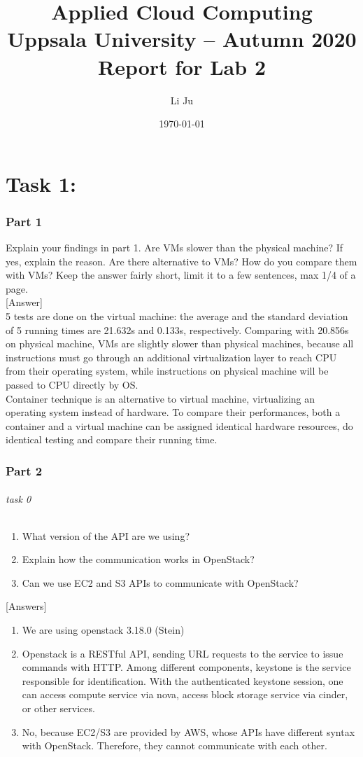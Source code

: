 \documentclass[a4paper,11pt]{article}
\title{\textbf{Applied Cloud Computing\\
    Uppsala University -- Autumn 2020 \\
    Report for Lab 2}}
\author{Li Ju}
\date{\today}
\begin{document}
\maketitle

\part{Task 1: }
\section{Part 1}
Explain your findings in part 1. Are VMs slower than the physical machine? If yes, explain the reason. Are there alternative to VMs? How do you compare them with VMs? Keep the answer fairly short, limit it to a few sentences, max 1/4 of a page.\\

[Answer]\\
5 tests are done on the virtual machine: the average and the standard deviation of 5 running times are 21.632s and 0.133s, respectively. Comparing with 20.856s on physical machine, VMs are slightly slower than physical machines, because all instructions must go through an additional virtualization layer to reach CPU from their operating system, while instructions on physical machine will be passed to CPU directly by OS. \\Container technique is an alternative to virtual machine, virtualizing an operating system instead of hardware. To compare their performances, both a container and a virtual machine can be assigned identical hardware resources, do identical testing and compare their running time. 


\section{Part 2}
\paragraph{task 0}
\begin{enumerate}
    \item What version of the API are we using?
    \item Explain how the communication works in OpenStack?
    \item Can we use EC2 and S3 APIs to communicate with OpenStack?
\end{enumerate}

[Answers]
\begin{enumerate}
    \item We are using openstack 3.18.0 (Stein)
    \item Openstack is a RESTful API, sending URL requests to the service to issue commands with HTTP\cite{OpenStackcommunication}. Among different components, keystone is the service responsible for identification. With the authenticated keystone session, one can access compute service via nova, access block storage service via cinder, or other services. 
    \item No, because EC2/S3 are provided by AWS, whose APIs have different syntax with OpenStack. Therefore, they cannot communicate with each other. 
\end{enumerate}
\end{document}
